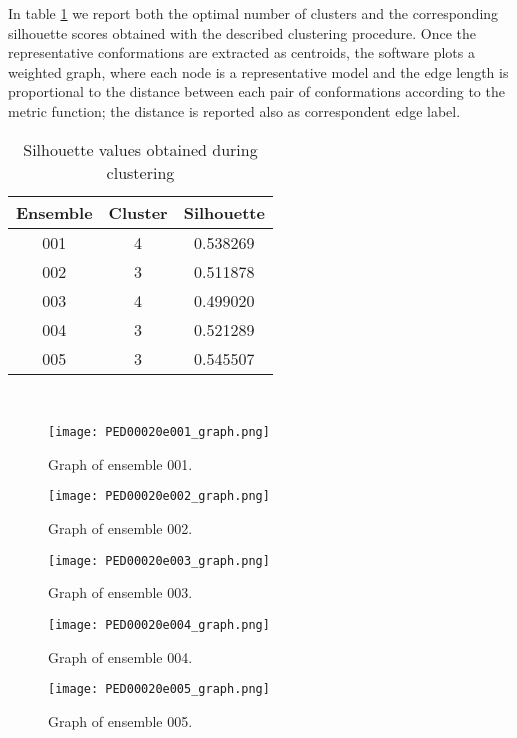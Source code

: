In table \ref{tab:silhouette} we report both the optimal number of clusters and the corresponding silhouette scores obtained with the described clustering procedure. 
Once the representative conformations are extracted as centroids, the software plots a weighted graph, where each node is a representative model and the edge length is proportional to the distance between each pair of conformations according to the metric function; the distance is reported also as correspondent edge label.

\begin{table}[H]
\begin{center}
\begin{tabular}{ccc}
\textbf{Ensemble} & \textbf{Cluster} & \textbf{Silhouette}\\
\hline
001 & 4 & 0.538269\\
\hline
002 & 3 & 0.511878\\
\hline
003 & 4 & 0.499020\\
\hline
004 & 3 & 0.521289\\
\hline
005 & 3 & 0.545507\\
\end{tabular}
\end{center}
\caption{Silhouette values obtained during clustering}~\label{tab:silhouette}
\end{table}

\begin{figure}[H]
    \centering
	\texttt{[image: PED00020e001\_graph.png]}
	\caption{Graph of ensemble 001.}
	\label{model001}
\end{figure}

\begin{figure}[H]
    \centering
		\texttt{[image: PED00020e002\_graph.png]}
		\caption{Graph of ensemble 002.}
		\label{model002}
\end{figure}

\begin{figure}[H]
    \centering
		\texttt{[image: PED00020e003\_graph.png]}
		\caption{Graph of ensemble 003.}
		\label{model003}
\end{figure}

\begin{figure}[H]
    \centering
		\texttt{[image: PED00020e004\_graph.png]}
		\caption{Graph of ensemble 004.}
		\label{model004}
\end{figure}

\begin{figure}[H]
    \centering
		\texttt{[image: PED00020e005\_graph.png]}
		\caption{Graph of ensemble 005.}
		\label{model005}
\end{figure}


